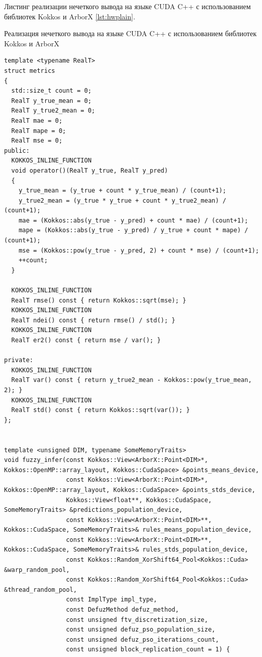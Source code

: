 \endgroup
Листинг реализации нечеткого вывода на языке CUDA C++ с использованием библиотек Kokkos и ArborX \cref{lst:hwplain}.
\begingroup
\captiondelim{ } %
\begin{ListingEnv}
\caption{Реализация нечеткого вывода на языке CUDA C++ с использованием библиотек Kokkos и ArborX}
\label{lst:cuda}
\end{ListingEnv}
\begin{verbatim}
template <typename RealT>
struct metrics
{
  std::size_t count = 0;
  RealT y_true_mean = 0;
  RealT y_true2_mean = 0;
  RealT mae = 0;
  RealT mape = 0;
  RealT mse = 0;
public:
  KOKKOS_INLINE_FUNCTION
  void operator()(RealT y_true, RealT y_pred)
  {
    y_true_mean = (y_true + count * y_true_mean) / (count+1);
    y_true2_mean = (y_true * y_true + count * y_true2_mean) / (count+1);
    mae = (Kokkos::abs(y_true - y_pred) + count * mae) / (count+1);
    mape = (Kokkos::abs(y_true - y_pred) / y_true + count * mape) / (count+1);
    mse = (Kokkos::pow(y_true - y_pred, 2) + count * mse) / (count+1);
    ++count;
  }

  KOKKOS_INLINE_FUNCTION
  RealT rmse() const { return Kokkos::sqrt(mse); }
  KOKKOS_INLINE_FUNCTION
  RealT ndei() const { return rmse() / std(); }
  KOKKOS_INLINE_FUNCTION
  RealT er2() const { return mse / var(); }

private:
  KOKKOS_INLINE_FUNCTION
  RealT var() const { return y_true2_mean - Kokkos::pow(y_true_mean, 2); }
  KOKKOS_INLINE_FUNCTION
  RealT std() const { return Kokkos::sqrt(var()); }
};


template <unsigned DIM, typename SomeMemoryTraits>
void fuzzy_infer(const Kokkos::View<ArborX::Point<DIM>*, Kokkos::OpenMP::array_layout, Kokkos::CudaSpace> &points_means_device,
                 const Kokkos::View<ArborX::Point<DIM>*, Kokkos::OpenMP::array_layout, Kokkos::CudaSpace> &points_stds_device,
                 Kokkos::View<float**, Kokkos::CudaSpace, SomeMemoryTraits> &predictions_population_device,
                 const Kokkos::View<ArborX::Point<DIM>**, Kokkos::CudaSpace, SomeMemoryTraits>& rules_means_population_device,
                 const Kokkos::View<ArborX::Point<DIM>**, Kokkos::CudaSpace, SomeMemoryTraits>& rules_stds_population_device,
                 const Kokkos::Random_XorShift64_Pool<Kokkos::Cuda> &warp_random_pool,
                 const Kokkos::Random_XorShift64_Pool<Kokkos::Cuda> &thread_random_pool,
                 const ImplType impl_type,
                 const DefuzMethod defuz_method,
                 const unsigned ftv_discretization_size,
                 const unsigned defuz_pso_population_size,
                 const unsigned defuz_pso_iterations_count,
                 const unsigned block_replication_count = 1) {


\end{verbatim}
